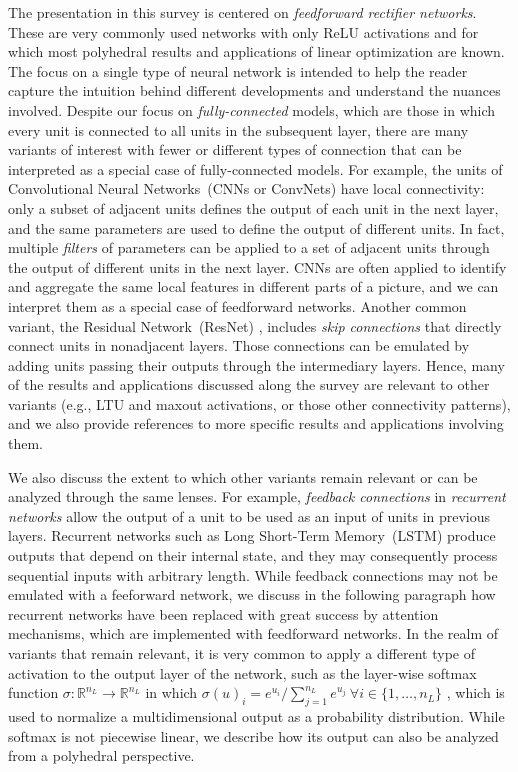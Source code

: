 The presentation in this survey is centered on \emph{feedforward rectifier networks}. These are very commonly used networks with only ReLU activations and for which most polyhedral results and applications of linear optimization are known. The focus on a single type of neural network is intended to help the reader capture the intuition behind different developments and understand the nuances involved. 
%
Despite our focus on \emph{fully-connected} models, which are those in which every unit is connected to all units in the subsequent layer, there are many variants of interest with fewer or different types of connection that can be interpreted as a special case of fully-connected models. For example, the units of Convolutional Neural Networks~(CNNs or ConvNets) \citep{CNN} have local connectivity:
only a subset of adjacent units defines the output of each unit in the next layer, and the same parameters are used to define the output of different units. In fact, multiple \emph{filters} of parameters can be applied to a set of adjacent units through the output of different units in the next layer. 
CNNs are often applied to identify and aggregate the same local features in different parts of a picture, 
and we can interpret them as a special case of feedforward networks. 
Another common variant, the Residual Network~(ResNet) \citep{He2016DeepRL}, includes \emph{skip connections} that directly connect units in nonadjacent layers. 
Those connections can be emulated by adding units passing their outputs through the intermediary layers. 
Hence, many of the results and applications discussed along the survey are relevant to other variants (e.g., LTU and maxout activations, or those other connectivity patterns), and we also provide references to more specific results and applications involving them. 

We also discuss the extent to which other variants remain relevant or can be analyzed through the same lenses. 
For example, \emph{feedback connections} in \emph{recurrent networks} \citep{recurrent1,recurrent2} allow the output of a unit to be used as an input of units in previous layers. 
Recurrent networks such as Long Short-Term Memory~(LSTM) \citep{LSTM} produce outputs that depend on their internal state, and they may consequently process sequential inputs with arbitrary length. 
While feedback connections may not be emulated with a feeforward network, we discuss in the following paragraph how recurrent networks have been replaced with great success by attention mechanisms, which are implemented with feedforward networks. 
In the realm of variants that remain relevant, it is very common to apply a different type of activation to the output layer of the network, such as the layer-wise softmax function $\sigma : \mathbb{R}^{n_{L}} \rightarrow \mathbb{R}^{n_{L}}$ in which $\sigma(u)_i = e^{u_i}/\sum_{j=1}^{n_{L}} e^{u_j} ~ \forall i \in \{1, \ldots, n_{L}\}$ \citep{softmax}, 
which is used to normalize a multidimensional output as a probability distribution. 
While softmax is not piecewise linear, 
we describe how its output can also be analyzed from a polyhedral perspective. 


